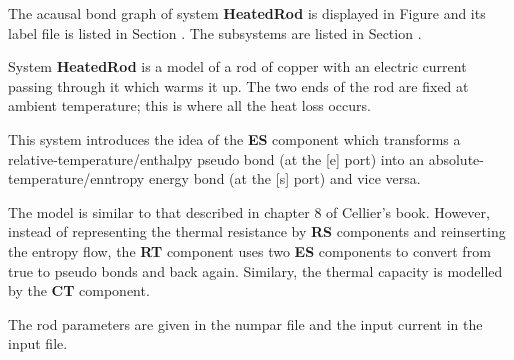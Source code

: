 





   The acausal bond graph of system \textbf{HeatedRod} is
   displayed in Figure  and its label
   file is listed in Section .
The subsystems are listed in Section .

 System \textbf{HeatedRod} is a model of a rod of copper with an
 electric current passing through it which warms it up. The two ends of
 the rod are fixed at ambient temperature; this is where all the heat
 loss occurs. 

 This system introduces the idea of the {\bf ES} component which
 transforms a relative-temperature/enthalpy pseudo bond (at the [e]
 port) into an absolute-temperature/enntropy energy bond (at the [s]
 port) and vice versa.

 The model is similar to that described in chapter 8 of
 Cellier's book. However, instead of representing the thermal
 resistance by {\bf RS} components and reinserting the entropy flow,
 the {\bf RT} component uses two {\bf ES} components to convert from
 true to pseudo bonds and back again. Similary, the thermal capacity is
 modelled by the {\bf CT} component.


 The rod parameters are given in the numpar file and the input current
 in the input file.
